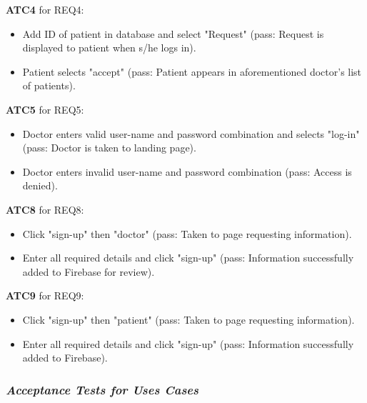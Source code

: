 \documentclass[a4paper]{article}
\begin{document}
\textbf{ATC4} for REQ4:

\begin{itemize}
\item Add ID of patient in database and select "Request" (pass: Request is displayed to patient when s/he logs in).
\item Patient selects "accept" (pass: Patient appears in aforementioned doctor's list of patients).
\end{itemize}

\textbf{ATC5} for REQ5:

\begin{itemize}
\item Doctor enters valid user-name and password combination and selects "log-in" (pass: Doctor is taken to landing page).
\item Doctor enters invalid user-name and password combination (pass: Access is denied).
\end{itemize}

\textbf{ATC8} for REQ8:

\begin{itemize}
\item Click "sign-up" then "doctor" (pass: Taken to page requesting information).
\item Enter all required details and click "sign-up" (pass: Information successfully added to Firebase for review).
\end{itemize}

\textbf{ATC9} for REQ9:

\begin{itemize}
\item Click "sign-up" then "patient" (pass: Taken to page requesting information).
\item Enter all required details and click "sign-up" (pass: Information successfully added to Firebase).
\end{itemize}

\subsubsection{\textit{Acceptance Tests for Uses Cases}}

\FloatBarrier
\end{document}
